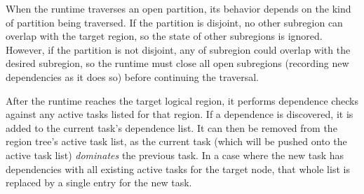 When the runtime traverses an open partition, its behavior depends on the kind
of partition being traversed.  If the partition is disjoint, no other subregion
can overlap with the target region, so the state of other subregions is
ignored.  However, if the partition is not disjoint, any 
of subregion could overlap with the desired subregion, so
the runtime must close all open subregions (recording new dependencies
as it does so) before continuing the traversal.

After the runtime reaches the target logical region, it performs dependence
checks against any active tasks listed for that region.  If a dependence is 
discovered, it is added to the current task's dependence list.  It can then
be removed from the region tree's active task list, as the current task (which
will be pushed onto the active task list) {\em dominates} the previous task.
In a case where the new task has dependencies with all existing active tasks
for the target node, that whole list is replaced by a single entry for the
new task.

